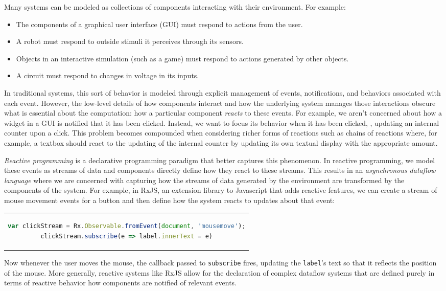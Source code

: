 Many systems can be modeled as collections of components interacting with their environment.
For example:
\begin{itemize}[itemsep=0pt]
  \item The components of a graphical user interface (GUI) must respond to actions from the user.
  \item A robot must respond to outside stimuli it perceives through its sensors.
  \item Objects in an interactive simulation (such as a game) must respond to actions generated by other objects.
  \item A circuit must respond to changes in voltage in its inputs.
\end{itemize}
In traditional systems, this sort of behavior is modeled through explicit management of events, notifications, and behaviors associated with each event.
However, the low-level details of how components interact and how the underlying system manages those interactions obscure what is essential about the computation: how a particular component \emph{reacts} to these events.
For example, we aren't concerned about how a widget in a GUI is notified that it has been clicked.
Instead, we want to focus its behavior when it has been clicked, \eg, updating an internal counter upon a click.
This problem becomes compounded when considering richer forms of reactions such as chains of reactions where, for example, a textbox should react to the updating of the internal counter by updating its own textual display with the appropriate amount.

\emph{Reactive programming} is a declarative programming paradigm that better captures this phenomenon.
In reactive programming, we model these events as streams of data and components directly define how they react to these streams.
This results in an \emph{asynchronous dataflow language} where we are concerned with capturing how the streams of data generated by the environment are transformed by the components of the system.
For example, in RxJS, an extension library to Javascript that adds reactive features, we can create a stream of mouse movement events for a button and then define how the system reacts to updates about that event:
\begin{center}\begin{tabular}{c}\begin{lstlisting}[language=Javascript]
var clickStream = Rx.Observable.fromEvent(document, 'mousemove');
clickStream.subscribe(e => label.innerText = e)
\end{lstlisting}\end{tabular}\end{center}
Now whenever the user moves the mouse, the callback passed to \verb+subscribe+ fires, updating the \verb+label+'s text so that it reflects the position of the mouse.
More generally, reactive systems like RxJS allow for the declaration of complex dataflow systems that are defined purely in terms of reactive behavior how components are notified of relevant events.

